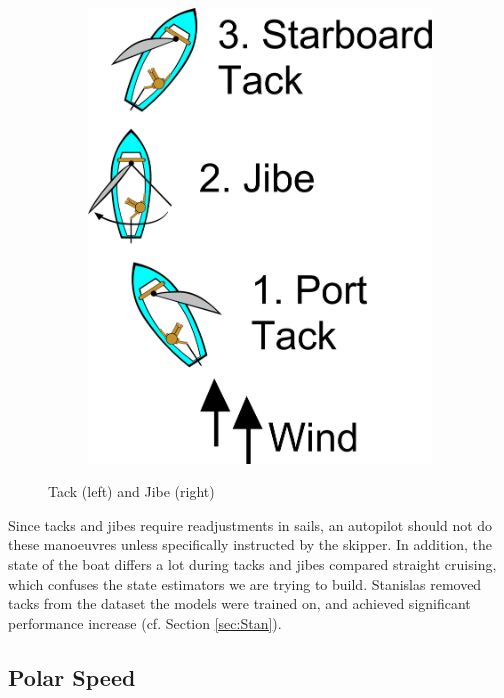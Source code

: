 \documentclass[12pt,twoside]{report}
\begin{document}
\begin{figure}[h]
\begin{subfigure}[b]{0.22\textwidth}
        \includegraphics[width=\textwidth]{figures/sailing/jibe.png}
        \label{fig:jibe}
    \end{subfigure}
    \caption{Tack (left) and Jibe (right) \cite{img:sailing-tack-gybe}}
    \label{fig:tack-jibe}
\end{figure}

Since tacks and jibes require readjustments in sails, an autopilot should not do these manoeuvres unless specifically instructed by the skipper. In addition, the state of the boat differs a lot during tacks and jibes compared straight cruising, which confuses the state estimators we are trying to build. Stanislas removed tacks from the dataset the models were trained on, and achieved significant performance increase (cf. Section \ref{sec:Stan}).

\subsection{Polar Speed}
\end{document}

